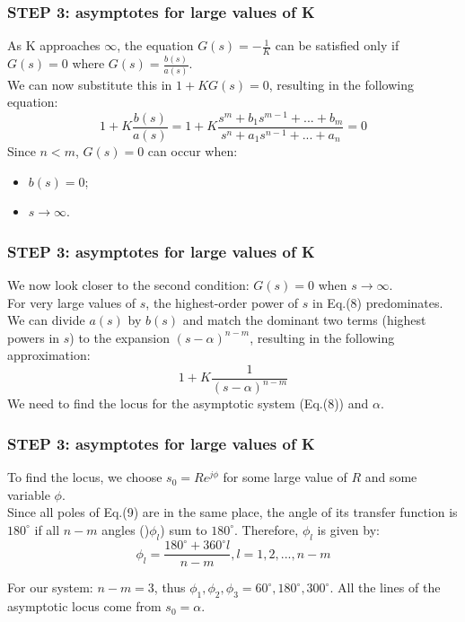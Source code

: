 \begin{frame}
\frametitle{STEP 3: asymptotes for large values of K}
	As K approaches $\infty$, the equation $G(s) = -\frac{1}{K}$ can be satisfied only if $G(s) = 0$ where $G(s) = \frac{b(s)}{a(s)}$.\\
	\vspace{1em}
	We can now substitute this in $1 + KG(s) = 0$, resulting in the following equation:
	\begin{equation}
	1 + K\frac{b(s)}{a(s)} = 1 + K\frac{s^m + b_1s^{m-1} + ... + b_m}{s^n + a_1s^{n-1} + ... + a_n} = 0
	\end{equation}
	Since $n < m$, $G(s) = 0$ can occur when: 
	\begin{itemize}
		\item $b(s) = 0$;
		\item $s \rightarrow \infty$.
	\end{itemize}
\end{frame}

\begin{frame}
\frametitle{STEP 3: asymptotes for large values of K}
	We now look closer to the second condition: $G(s) = 0$ when $s \rightarrow \infty$.\\
	\vspace{1em}
	For very large values of $s$, the highest-order power of $s$ in Eq.(8) predominates. We can divide $a(s)$ by $b(s)$ and match the dominant two terms (highest powers in $s$) to the expansion $(s-\alpha)^{n-m}$, resulting in the following approximation:
	\begin{equation}
		1 + K\frac{1}{(s-\alpha)^{n-m}}
	\end{equation}
	We need to find the locus for the asymptotic system (Eq.(8)) and $\alpha$.
\end{frame}

\begin{frame}	
\frametitle{STEP 3: asymptotes for large values of K}
	To find the locus, we choose $s_0 = Re^{j\phi}$ for some large value of $R$ and some variable $\phi$.\\
	\vspace{1em}
	Since all poles of Eq.(9) are in the same place, the angle of its transfer function is $180^{\circ}$ if all $n-m$ angles ()$\phi_l$) sum to $180^{\circ}$. Therefore, $\phi_l$ is given by: 
	\begin{equation}
	\phi_l = \frac{180^{\circ} + 360^{\circ}l}{n-m}, l = 1,2,...,n-m
	\end{equation}	
	\vspace{-0.5em}	
	\begin{exampleblock}{}
	For our system: $n-m=3$, thus $\phi_1, \phi_2, \phi_3 = 60^{\circ}, 180^{\circ}, 300^{\circ}$.
	All the lines of the asymptotic locus come from $s_0 = \alpha$.
	\end{exampleblock}
\end{frame}

